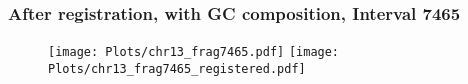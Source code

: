 \documentclass[10pt,dvipsnames,table]{beamer}
\begin{document}

\begin{frame}
\frametitle{After registration, with GC composition, Interval 7465}
\begin{figure}[t]
\texttt{[image: Plots/chr13\_frag7465.pdf]}
\texttt{[image: Plots/chr13\_frag7465\_registered.pdf]}
\end{figure}
\end{frame}
\end{document}
